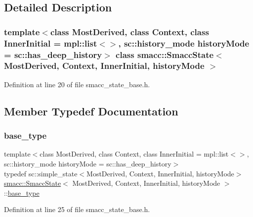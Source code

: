 \subsection{Detailed Description}
\subsubsection*{template$<$class Most\+Derived, class Context, class Inner\+Initial = mpl\+::list$<$$>$, sc\+::history\+\_\+mode history\+Mode = sc\+::has\+\_\+deep\+\_\+history$>$\newline
class smacc\+::\+Smacc\+State$<$ Most\+Derived, Context, Inner\+Initial, history\+Mode $>$}



Definition at line 20 of file smacc\+\_\+state\+\_\+base.\+h.



\subsection{Member Typedef Documentation}
\mbox{\label{classsmacc_1_1SmaccState_a68f547c6fe147554bbe607b6fcd8e40a}} 
\subsubsection{\texorpdfstring{base\+\_\+type}{base\_type}}
{\footnotesize\ttfamily template$<$class Most\+Derived, class Context, class Inner\+Initial = mpl\+::list$<$$>$, sc\+::history\+\_\+mode history\+Mode = sc\+::has\+\_\+deep\+\_\+history$>$ \\
typedef sc\+::simple\+\_\+state$<$Most\+Derived, Context, Inner\+Initial, history\+Mode$>$ \hyperlink{classsmacc_1_1SmaccState}{smacc\+::\+Smacc\+State}$<$ Most\+Derived, Context, Inner\+Initial, history\+Mode $>$\+::\hyperlink{classsmacc_1_1SmaccState_a68f547c6fe147554bbe607b6fcd8e40a}{base\+\_\+type}\hspace{0.3cm}{\ttfamily [private]}}



Definition at line 25 of file smacc\+\_\+state\+\_\+base.\+h.

\mbox{\label{classsmacc_1_1SmaccState_a0e15b77514301039f6bc093a9d3f6425}} 
